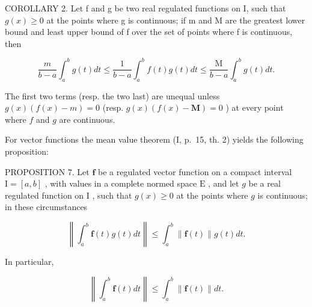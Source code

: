 COROLLARY 2. Let f and g be two real regulated functions on I, such that \(g(x) \geqslant 0\) at the points where g is continuous; if m and M are the greatest lower bound and least upper bound of f over the set of points where f is continuous, then

\[
\frac {m}{b - a} \int_ {a} ^ {b} g (t) d t \leqslant \frac {1}{b - a} \int_ {a} ^ {b} f (t) g (t) d t \leqslant \frac {\mathrm{M}}{b - a} \int_ {a} ^ {b} g (t) d t.\tag{14}
\]

The first two terms (resp. the two last) are unequal unless \(g(x)(f(x) - m) = 0\) (resp. \(g(x)(f(x) - \mathbf{M}) = 0\) ) at every point where \(f\) and \(g\) are continuous.

For vector functions the mean value theorem (I, p.~15, th. 2) yields the following proposition:

PROPOSITION 7. Let \(\mathbf{f}\) be a regulated vector function on a compact interval \(\mathrm{I} = [a, b]\) , with values in a complete normed space \(\mathrm{E}\) , and let \(g\) be a real regulated function on \(\mathrm{I}\) , such that \(g(x) \geqslant 0\) at the points where \(g\) is continuous; in these circumstances

\[
\left\| \int_ {a} ^ {b} \mathbf {f} (t) g (t) d t \right\| \leqslant \int_ {a} ^ {b} \| \mathbf {f} (t) \| g (t) d t.\tag{15}
\]

In particular,

\[
\left\| \int_ {a} ^ {b} \mathbf {f} (t) d t \right\| \leqslant \int_ {a} ^ {b} \| \mathbf {f} (t) \| d t.\tag{16}
\]

